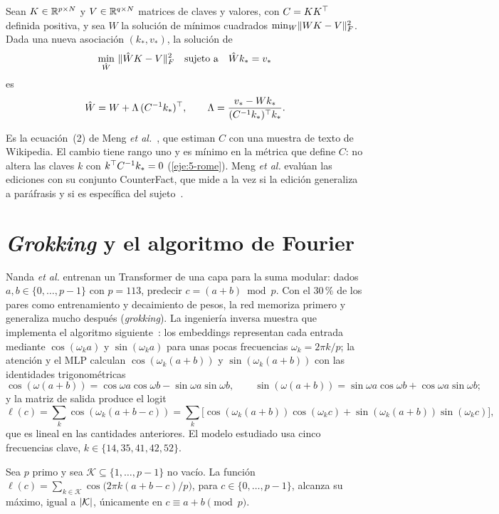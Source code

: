 \begin{teorema}\label{teo:rome}
Sean $K\in\mathbb{R}^{p\times N}$ y $V\in\mathbb{R}^{q\times N}$ matrices de claves y valores, con $C=KK^{\top}$ definida positiva, y sea $W$ la solución de mínimos cuadrados $\min_W\lVert WK-V\rVert_F^{2}$. Dada una nueva asociación $(k_*,v_*)$, la solución de
\[
\min_{\hat W}\ \lVert\hat WK-V\rVert_F^{2}\quad\text{sujeto a}\quad \hat Wk_*=v_*
\]
es
\[
\hat W=W+\Lambda\,(C^{-1}k_*)^{\top},\qquad \Lambda=\frac{v_*-Wk_*}{(C^{-1}k_*)^{\top} k_*}.
\]
\end{teorema}

Es la ecuación~(2) de Meng \emph{et al.}~\cite[§3.1]{meng}, que estiman $C$ con una muestra de texto de Wikipedia. El cambio tiene rango uno y es mínimo en la métrica que define $C$: no altera las claves $k$ con $k^{\top} C^{-1}k_*=0$ (\cref{eje:5-rome}). Meng \emph{et al.} evalúan las ediciones con su conjunto CounterFact, que mide a la vez si la edición generaliza a paráfrasis y si es específica del sujeto~\cite[§3.3]{meng}.

\addtocounter{definicion}{1}%

\section{\emph{Grokking} y el algoritmo de Fourier}

Nanda \emph{et al.} entrenan un Transformer de una capa para la suma modular: dados $a,b\in\{0,\dots,p-1\}$ con $p=113$, predecir $c=(a+b)\bmod p$. Con el $30\,\%$ de los pares como entrenamiento y decaimiento de pesos, la red memoriza primero y generaliza mucho después (\emph{grokking}). La ingeniería inversa muestra que implementa el algoritmo siguiente~\cite[§3.1 y §4]{nanda}: los embeddings representan cada entrada mediante $\cos(\omega_ka)$ y $\sin(\omega_ka)$ para unas pocas frecuencias $\omega_k=2\pi k/p$; la atención y el MLP calculan $\cos(\omega_k(a+b))$ y $\sin(\omega_k(a+b))$ con las identidades trigonométricas
\[
\cos(\omega(a+b))=\cos\omega a\cos\omega b-\sin\omega a\sin\omega b,\qquad \sin(\omega(a+b))=\sin\omega a\cos\omega b+\cos\omega a\sin\omega b;
\]
y la matriz de salida produce el logit
\[
\ell(c)=\sum_k\cos(\omega_k(a+b-c))=\sum_k\bigl[\cos(\omega_k(a+b))\cos(\omega_kc)+\sin(\omega_k(a+b))\sin(\omega_kc)\bigr],
\]
que es lineal en las cantidades anteriores. El modelo estudiado usa cinco frecuencias clave, $k\in\{14,35,41,42,52\}$.

\begin{proposicion}\label{prop:fourier}
Sea $p$ primo y sea $\mathcal{K}\subseteq\{1,\dots,p-1\}$ no vacío. La función $\ell(c)=\sum_{k\in\mathcal{K}}\cos\bigl(2\pi k(a+b-c)/p\bigr)$, para $c\in\{0,\dots,p-1\}$, alcanza su máximo, igual a $\lvert\mathcal{K}\rvert$, únicamente en $c\equiv a+b\pmod p$.
\end{proposicion}

